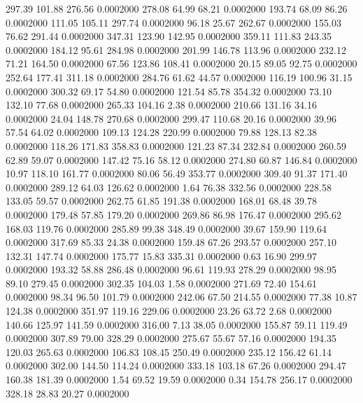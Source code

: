  297.39  101.88  276.56   0.0002000
 278.08   64.99   68.21   0.0002000
 193.74   68.09   86.26   0.0002000
 111.05  105.11  297.74   0.0002000
  96.18   25.67  262.67   0.0002000
 155.03   76.62  291.44   0.0002000
 347.31  123.90  142.95   0.0002000
 359.11  111.83  243.35   0.0002000
 184.12   95.61  284.98   0.0002000
 201.99  146.78  113.96   0.0002000
 232.12   71.21  164.50   0.0002000
  67.56  123.86  108.41   0.0002000
  20.15   89.05   92.75   0.0002000
 252.64  177.41  311.18   0.0002000
 284.76   61.62   44.57   0.0002000
 116.19  100.96   31.15   0.0002000
 300.32   69.17   54.80   0.0002000
 121.54   85.78  354.32   0.0002000
  73.10  132.10   77.68   0.0002000
 265.33  104.16    2.38   0.0002000
 210.66  131.16   34.16   0.0002000
  24.04  148.78  270.68   0.0002000
 299.47  110.68   20.16   0.0002000
  39.96   57.54   64.02   0.0002000
 109.13  124.28  220.99   0.0002000
  79.88  128.13   82.38   0.0002000
 118.26  171.83  358.83   0.0002000
 121.23   87.34  232.84   0.0002000
 260.59   62.89   59.07   0.0002000
 147.42   75.16   58.12   0.0002000
 274.80   60.87  146.84   0.0002000
  10.97  118.10  161.77   0.0002000
  80.06   56.49  353.77   0.0002000
 309.40   91.37  171.40   0.0002000
 289.12   64.03  126.62   0.0002000
   1.64   76.38  332.56   0.0002000
 228.58  133.05   59.57   0.0002000
 262.75   61.85  191.38   0.0002000
 168.01   68.48   39.78   0.0002000
 179.48   57.85  179.20   0.0002000
 269.86   86.98  176.47   0.0002000
 295.62  168.03  119.76   0.0002000
 285.89   99.38  348.49   0.0002000
  39.67  159.90  119.64   0.0002000
 317.69   85.33   24.38   0.0002000
 159.48   67.26  293.57   0.0002000
 257.10  132.31  147.74   0.0002000
 175.77   15.83  335.31   0.0002000
   0.63   16.90  299.97   0.0002000
 193.32   58.88  286.48   0.0002000
  96.61  119.93  278.29   0.0002000
  98.95   89.10  279.45   0.0002000
 302.35  104.03    1.58   0.0002000
 271.69   72.40  154.61   0.0002000
  98.34   96.50  101.79   0.0002000
 242.06   67.50  214.55   0.0002000
  77.38   10.87  124.38   0.0002000
 351.97  119.16  229.06   0.0002000
  23.26   63.72    2.68   0.0002000
 140.66  125.97  141.59   0.0002000
 316.00    7.13   38.05   0.0002000
 155.87   59.11  119.49   0.0002000
 307.89   79.00  328.29   0.0002000
 275.67   55.67   57.16   0.0002000
 194.35  120.03  265.63   0.0002000
 106.83  108.45  250.49   0.0002000
 235.12  156.42   61.14   0.0002000
 302.00  144.50  114.24   0.0002000
 333.18  103.18   67.26   0.0002000
 294.47  160.38  181.39   0.0002000
   1.54   69.52   19.59   0.0002000
   0.34  154.78  256.17   0.0002000
 328.18   28.83   20.27   0.0002000
